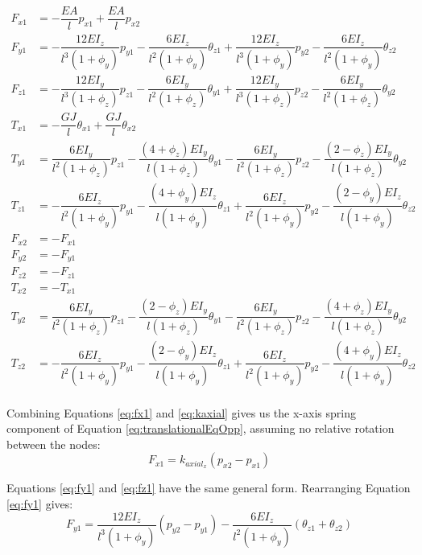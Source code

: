 {\begin{subequations}
\begin{align} 
\label{eq:fx1}
F_{x1} &=  -\dfrac{EA}{l}p_{x1} + \dfrac{EA}{l}p_{x2} \\[10pt]
\label{eq:fy1}
F_{y1} &=  -\dfrac{12EI_z}{l^3(1+\phi_y)}p_{y1} - \dfrac{6EI_z}{l^2(1+\phi_y)}\theta_{z1} + \dfrac{12EI_z}{l^3(1+\phi_y)}p_{y2} - \dfrac{6EI_z}{l^2(1+\phi_y)}\theta_{z2}\\[10pt]
\label{eq:fz1}
F_{z1} &=  -\dfrac{12EI_y}{l^3(1+\phi_z)}p_{z1} - \dfrac{6EI_y}{l^2(1+\phi_z)}\theta_{y1} + \dfrac{12EI_y}{l^3(1+\phi_z)}p_{z2} - \dfrac{6EI_y}{l^2(1+\phi_z)}\theta_{y2}\\[10pt]
\label{eq:tx1}
T_{x1} &=  -\dfrac{GJ}{l}\theta_{x1} + \dfrac{GJ}{l}\theta_{x2} \\[10pt]
\label{eq:ty1}
T_{y1} &= \dfrac{6EI_y}{l^2(1+\phi_z)}p_{z1} - \dfrac{(4+\phi_z)EI_y}{l(1+\phi_z)}\theta_{y1}  - \dfrac{6EI_y}{l^2(1+\phi_z)}p_{z2} - \dfrac{(2-\phi_z)EI_y}{l(1+\phi_z)}\theta_{y2} \\[10pt]
\label{eq:tz1}
T_{z1} &=  -\dfrac{6EI_z}{l^2(1+\phi_y)}p_{y1} - \dfrac{(4+\phi_y)EI_z}{l(1+\phi_y)}\theta_{z1}  + \dfrac{6EI_z}{l^2(1+\phi_y)}p_{y2} - \dfrac{(2-\phi_y)EI_z}{l(1+\phi_y)}\theta_{z2} \\[10pt]
\label{eq:fx2}
F_{x2} &=  -F_{x1}\\[10pt]
\label{eq:fy2}
F_{y2} &=  -F_{y1}\\[10pt]
\label{eq:fz2}
F_{z2} &=  -F_{z1}\\[10pt]
\label{eq:tx2}
T_{x2} &=  -T_{x1}\\[10pt]
\label{eq:ty2}
T_{y2} &=  \dfrac{6EI_y}{l^2(1+\phi_z)}p_{z1} - \dfrac{(2-\phi_z)EI_y}{l(1+\phi_z)}\theta_{y1}  - \dfrac{6EI_y}{l^2(1+\phi_z)}p_{z2} - \dfrac{(4+\phi_z)EI_y}{l(1+\phi_z)}\theta_{y2} \\[10pt]
\label{eq:tz2}
T_{z2} &= -\dfrac{6EI_z}{l^2(1+\phi_y)}p_{y1} - \dfrac{(2-\phi_y)EI_z}{l(1+\phi_y)}\theta_{z1}  + \dfrac{6EI_z}{l^2(1+\phi_y)}p_{y2} - \dfrac{(4+\phi_y)EI_z}{l(1+\phi_y)}\theta_{z2}
\end{align}
\end{subequations}\\

Combining Equations \ref{eq:fx1} and \ref{eq:kaxial} gives us the x-axis spring component of Equation \ref{eq:translationalEqOpp}, assuming no relative rotation between the nodes:
\[F_{x1} =  k_{axial_x}(p_{x2} - p_{x1}) \]

Equations \ref{eq:fy1} and \ref{eq:fz1} have the same general form.  Rearranging Equation \ref{eq:fy1} gives:
\begin{equation}\label{eq:Fy1decomp}
 F_{y1} =  \dfrac{12EI_z}{l^3(1+\phi_y)} (p_{y2} -p_{y1}) - \dfrac{6EI_z}{l^2(1+\phi_y)}(\theta_{z1} + \theta_{z2}) 
 \end{equation}

}
